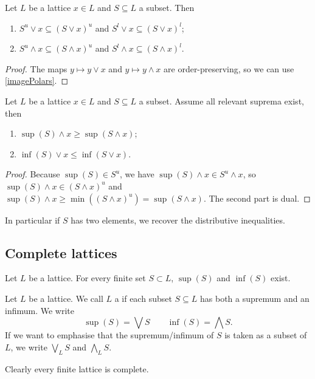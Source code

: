 \begin{lemma} \label{UpperLowerBoundsMeetJoin}
Let $L$ be a lattice $x\in L$ and $S\subseteq L$ a subset. Then
\begin{enumerate}
\item $S^u\vee x \subseteq (S\vee x)^u$ and $S^l\vee x \subseteq (S\vee x)^l$;
\item $S^u\wedge x \subseteq (S\wedge x)^u$ and $S^l\wedge x \subseteq (S\wedge x)^l$.
\end{enumerate}
\end{lemma}
\begin{proof}
The maps $y\mapsto y\vee x$ and $y\mapsto y \wedge x$ are order-preserving, so we can use \ref{imagePolars}.
\end{proof}
\begin{corollary} \label{infiniteDistributiveInequalities}
Let $L$ be a lattice $x\in L$ and $S\subseteq L$ a subset. Assume all relevant suprema exist, then
\begin{enumerate}
\item $\sup(S)\wedge x \geq \sup(S \wedge x)$;
\item $\inf(S)\vee x \leq \inf(S \vee x)$.
\end{enumerate}
\end{corollary}
\begin{proof}
Because $\sup(S)\in S^u$, we have $\sup(S)\wedge x \in S^u\wedge x$, so $\sup(S)\wedge x \in (S\wedge x)^u$ and $\sup(S)\wedge x \geq \min((S\wedge x)^u) = \sup(S\wedge x)$. The second part is dual.
\end{proof}
In particular if $S$ has two elements, we recover the distributive inequalities.


\subsection{Complete lattices}
\begin{lemma}
Let $L$ be a lattice. For every finite set $S\subset L$, $\sup(S)$ and $\inf(S)$ exist.
\end{lemma}
\begin{definition}
Let $L$ be a lattice. We call $L$ a  if each subset $S\subseteq L$ has both a supremum and an infimum. We write
\[ \sup(S) = \bigvee S \qquad \inf(S) = \bigwedge S. \]
If we want to emphasise that the supremum/infimum of $S$ is taken as a subset of $L$, we write $\bigvee_L S$ and $\bigwedge_L S$.
\end{definition}
Clearly every finite lattice is complete.

